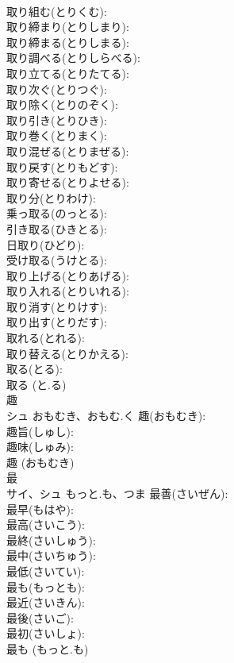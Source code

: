 \documentclass[8pt]{extreport}
\begin{document}
\begin{CJK}{UTF8}{min}
\\	取り組む(とりくむ): 
\\	取り締まり(とりしまり): 
\\	取り締まる(とりしまる): 
\\	取り調べる(とりしらべる): 
\\	取り立てる(とりたてる): 
\\	取り次ぐ(とりつぐ): 
\\	取り除く(とりのぞく): 
\\	取り引き(とりひき): 
\\	取り巻く(とりまく): 
\\	取り混ぜる(とりまぜる): 
\\	取り戻す(とりもどす): 
\\	取り寄せる(とりよせる): 
\\	取り分(とりわけ): 
\\	乗っ取る(のっとる): 
\\	引き取る(ひきとる): 
\\	日取り(ひどり): 
\\	受け取る(うけとる): 
\\	取り上げる(とりあげる): 
\\	取り入れる(とりいれる): 
\\	取り消す(とりけす): 
\\	取り出す(とりだす): 
\\	取れる(とれる): 
\\	取り替える(とりかえる): 
\\	取る(とる): 
\\	取る (と.る)
\\	趣			
\\	シュ	おもむき、おもむ.く	趣(おもむき): 
\\	趣旨(しゅし): 
\\	趣味(しゅみ): 
\\	趣 (おもむき)
\\	最			
\\	サイ、シュ	もっと.も、つま	最善(さいぜん): 
\\	最早(もはや): 
\\	最高(さいこう): 
\\	最終(さいしゅう): 
\\	最中(さいちゅう): 
\\	最低(さいてい): 
\\	最も(もっとも): 
\\	最近(さいきん): 
\\	最後(さいご): 
\\	最初(さいしょ): 
\\	最も (もっと.も)

\end{CJK}
\end{document}
